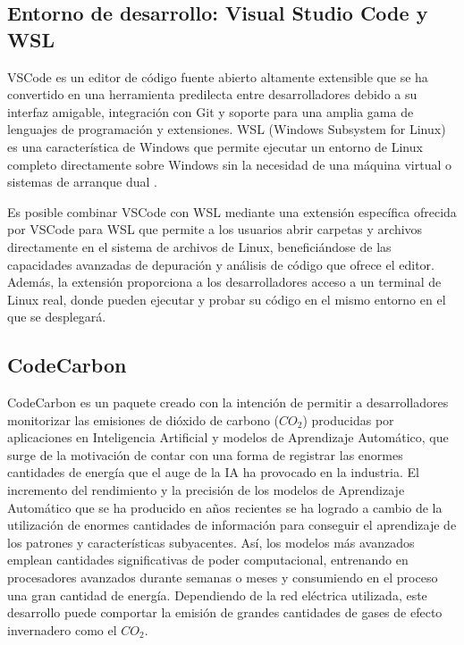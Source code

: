\subsection{Entorno de desarrollo: Visual Studio Code y WSL}
\label{sec:dev-env}

VSCode es un editor de código fuente abierto altamente extensible que se ha convertido en una herramienta predilecta entre desarrolladores debido a su interfaz amigable, integración con Git y soporte para una amplia gama de lenguajes de programación y extensiones. WSL (Windows Subsystem for Linux) es una característica de Windows que permite ejecutar un entorno de Linux completo directamente sobre Windows sin la necesidad de una máquina virtual o sistemas de arranque dual \cite{barnes2021pro}.

Es posible combinar VSCode con WSL mediante una extensión específica ofrecida por VSCode para WSL que permite a los usuarios abrir carpetas y archivos directamente en el sistema de archivos de Linux, beneficiándose de las capacidades avanzadas de depuración y análisis de código que ofrece el editor. Además, la extensión proporciona a los desarrolladores acceso a un terminal de Linux real, donde pueden ejecutar y probar su código en el mismo entorno en el que se desplegará. 


\subsection{CodeCarbon}

CodeCarbon \cite{codecarbon}\cite{codecarbon-software} es un paquete creado con la intención de permitir a desarrolladores monitorizar las emisiones de dióxido de carbono ($CO_{2}$) producidas por aplicaciones en Inteligencia Artificial y modelos de Aprendizaje Automático, que surge de la motivación de contar con una forma de registrar las enormes cantidades de energía que el auge de la IA ha provocado en la industria. El incremento del rendimiento y la precisión de los modelos de Aprendizaje Automático que se ha producido en años recientes se ha logrado a cambio de la utilización de enormes cantidades de información para conseguir el aprendizaje de los patrones y características subyacentes. Así, los modelos más avanzados emplean cantidades significativas de poder computacional, entrenando en procesadores avanzados durante semanas o meses y consumiendo en el proceso una gran cantidad de energía. Dependiendo de la red eléctrica utilizada, este desarrollo puede comportar la emisión de grandes cantidades de gases de efecto invernadero como el $CO_{2}$.

